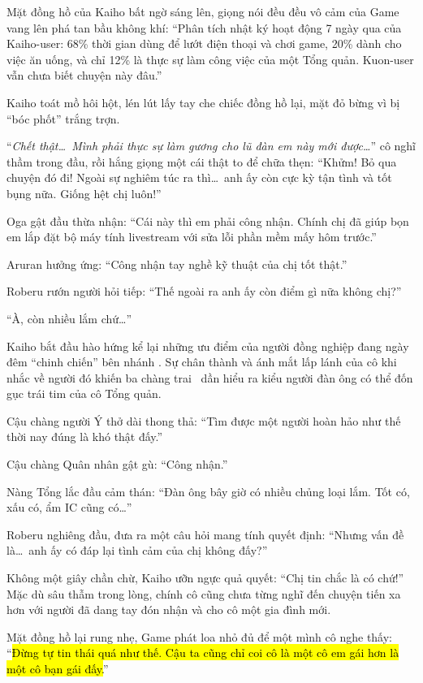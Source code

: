 \documentclass[../main.tex]{subfiles}
\begin{document}
Mặt đồng hồ của Kaiho bất ngờ sáng lên, giọng nói đều đều vô cảm của Game vang lên phá tan bầu không khí: ``Phân tích nhật ký hoạt động 7 ngày qua của Kaiho-user: 68\% thời gian dùng để lướt điện thoại và chơi game, 20\% dành cho việc ăn uống, và chỉ 12\% là thực sự làm công việc của một Tổng quản. Kuon-user vẫn chưa biết chuyện này đâu.''

Kaiho toát mồ hôi hột, lén lút lấy tay che chiếc đồng hồ lại, mặt đỏ bừng vì bị ``bóc phốt'' trắng trợn.

``\textit{Chết thật\dots\ Mình phải thực sự làm gương cho lũ đàn em này mới được\dots}'' cô nghĩ thầm trong đầu, rồi hắng giọng một cái thật to để chữa thẹn: ``Khửm! Bỏ qua chuyện đó đi! Ngoài sự nghiêm túc ra thì\dots\ anh ấy còn cực kỳ tận tình và tốt bụng nữa. Giống hệt chị luôn!''

Oga gật đầu thừa nhận: ``Cái này thì em phải công nhận. Chính chị đã giúp bọn em lắp đặt bộ máy tính livestream với sửa lỗi phần mềm mấy hôm trước.''

Aruran hưởng ứng: ``Công nhận tay nghề kỹ thuật của chị tốt thật.''

Roberu rướn người hỏi tiếp: ``Thế ngoài ra anh ấy còn điểm gì nữa không chị?''

``À, còn nhiều lắm chứ\dots''

Kaiho bắt đầu hào hứng kể lại những ưu điểm của người đồng nghiệp đang ngày đêm ``chinh chiến'' bên nhánh \hll. Sự chân thành và ánh mắt lấp lánh của cô khi nhắc về người đó khiến ba chàng trai \hls\ dần hiểu ra kiểu người đàn ông có thể đốn gục trái tim của cô Tổng quản.

Cậu chàng người Ý thở dài thong thả: ``Tìm được một người hoàn hảo như thế thời nay đúng là khó thật đấy.''

Cậu chàng Quân nhân gật gù: ``Công nhận.''

Nàng Tổng lắc đầu cảm thán: ``Đàn ông bây giờ có nhiều chủng loại lắm. Tốt có, xấu có, ẩm IC cũng có\dots''

Roberu nghiêng đầu, đưa ra một câu hỏi mang tính quyết định: ``Nhưng vấn đề là\dots\ anh ấy có đáp lại tình cảm của chị không đấy?''

Không một giây chần chừ, Kaiho ưỡn ngực quả quyết: ``Chị tin chắc là có chứ!'' Mặc dù sâu thẫm trong lòng, chính cô cũng chưa từng nghĩ đến chuyện tiến xa hơn với người đã dang tay đón nhận và cho cô một gia đình mới.

Mặt đồng hồ lại rung nhẹ, Game phát loa nhỏ đủ để một mình cô nghe thấy: ``\hl{Đừng tự tin thái quá như thế. Cậu ta cũng chỉ coi cô là một cô em gái hơn là một cô bạn gái đấy.}''
\end{document}
